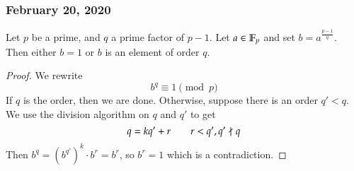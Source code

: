 \subsubsection*{February 20, 2020}
\begin{theorem}
	Let $p$ be a prime, and $q$ a prime factor of $p-1$. Let $a\in \mathbb{F}_p$ and set $b=a^{\frac{p-1}{q}}$. Then either $b=1$ or $b$ is an element of order $q$. 
\end{theorem}
\begin{proof}
	We rewrite
	\[b^q\equiv 1\pmod{p} \]
	If $q$ is the order, then we are done. Otherwise, suppose there is an order $q'<q$. We use the division algorithm on $q$ and $q'$ to get
	\[q=kq'+r\qquad r< q', q'\not\mid q\]
	Then $b^q = (b^{q'})^k\cdot b^r=b^r$, so $b^r=1$ which is a contradiction. 
\end{proof}


